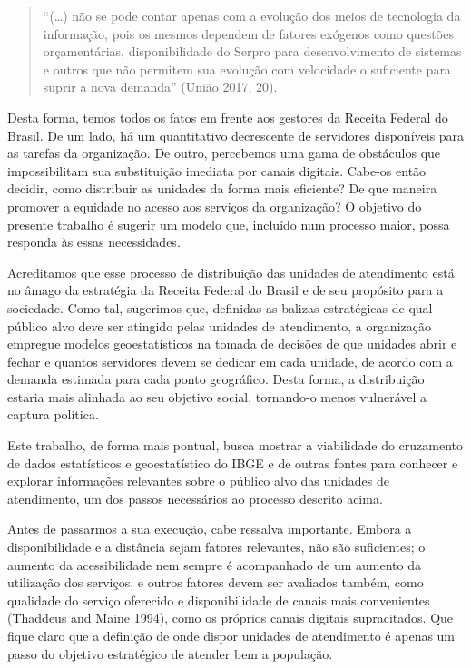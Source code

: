 \documentclass[]{article}
\begin{document}
\begin{quote}
``(\ldots{}) não se pode contar apenas com a evolução dos meios de
tecnologia da informação, pois os mesmos dependem de fatores exógenos
como questões orçamentárias, disponibilidade do Serpro para
desenvolvimento de sistemas e outros que não permitem sua evolução com
velocidade o suficiente para suprir a nova demanda'' (União 2017, 20).
\end{quote}

Desta forma, temos todos os fatos em frente aos gestores da Receita
Federal do Brasil. De um lado, há um quantitativo decrescente de
servidores disponíveis para as tarefas da organização. De outro,
percebemos uma gama de obstáculos que impossibilitam sua substituição
imediata por canais digitais. Cabe-os então decidir, como distribuir as
unidades da forma mais eficiente? De que maneira promover a equidade no
acesso aos serviços da organização? O objetivo do presente trabalho é
sugerir um modelo que, incluído num processo maior, possa responda às
essas necessidades.

Acreditamos que esse processo de distribuição das unidades de
atendimento está no âmago da estratégia da Receita Federal do Brasil e
de seu propósito para a sociedade. Como tal, sugerimos que, definidas as
balizas estratégicas de qual público alvo deve ser atingido pelas
unidades de atendimento, a organização empregue modelos geoestatísticos
na tomada de decisões de que unidades abrir e fechar e quantos
servidores devem se dedicar em cada unidade, de acordo com a demanda
estimada para cada ponto geográfico. Desta forma, a distribuição estaria
mais alinhada ao seu objetivo social, tornando-o menos vulnerável a
captura política.

Este trabalho, de forma mais pontual, busca mostrar a viabilidade do
cruzamento de dados estatísticos e geoestatístico do IBGE e de outras
fontes para conhecer e explorar informações relevantes sobre o público
alvo das unidades de atendimento, um dos passos necessários ao processo
descrito acima.

Antes de passarmos a sua execução, cabe ressalva importante. Embora a
disponibilidade e a distância sejam fatores relevantes, não são
suficientes; o aumento da acessibilidade nem sempre é acompanhado de um
aumento da utilização dos serviços, e outros fatores devem ser avaliados
também, como qualidade do serviço oferecido e disponibilidade de canais
mais convenientes (Thaddeus and Maine 1994), como os próprios canais
digitais supracitados. Que fique claro que a definição de onde dispor
unidades de atendimento é apenas um passo do objetivo estratégico de
atender bem a população.
\end{document}
